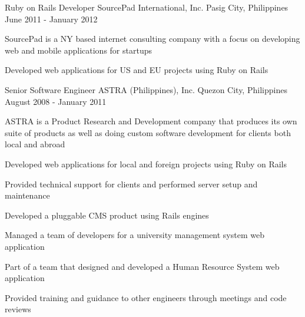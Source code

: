 \begin{cventries}
  \cventry
    {Ruby on Rails Developer} %
    {SourcePad International, Inc.} %
    {Pasig City, Philippines} %
    {June 2011 - January 2012} %
    {
      \begin{cvitems} %
        \item {SourcePad is a NY based internet consulting company with a focus on developing web and mobile applications for startups}
        \item {Developed web applications for US and EU projects using Ruby on Rails}
      \end{cvitems} 
    }

  \cventry
    {Senior Software Engineer} %
    {ASTRA (Philippines), Inc.} %
    {Quezon City, Philippines} %
    {August 2008 - January 2011} %
    {
      \begin{cvitems} %
        \item {ASTRA is a Product Research and Development company that produces its own suite of products as well as doing custom software development for clients both local and abroad}
        \item {Developed web applications for local and foreign projects using Ruby on Rails}
        \item {Provided technical support for clients and performed server setup and maintenance}
        \item {Developed a pluggable CMS product using Rails engines}
        \item {Managed a team of developers for a university management system web application}
        \item {Part of a team that designed and developed a Human Resource System web application}
        \item {Provided training and guidance to other engineers through meetings and code reviews}
      \end{cvitems}
    }


\end{cventries}
